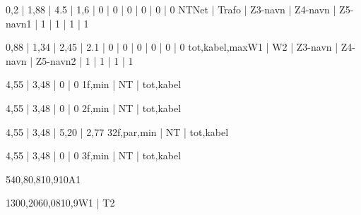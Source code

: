 \documentclass[a4paper,oneside,10pt,danish]{report}
\begin{document}
\begin{Ztotal}{ 0,2 | 1,88 | 4.5 | 1,6 | 0 | 0 | 0 | 0 | 0 | 0 }{NT}{Net | Trafo | Z3-navn | Z4-navn | Z5-navn}{1 | 1 | 1 | 1 | 1}
\end{Ztotal}

\begin{LV-Ztotal-max}{ 0,88 | 1,34 | 2,45 | 2.1 | 0 | 0 | 0 | 0 | 0 | 0 }{tot,kabel,max}{W1 | W2 | Z3-navn | Z4-navn | Z5-navn}{2 | 1 | 1 | 1 | 1}
\end{LV-Ztotal-max}

\begin{LV-Ik1f-kA}{ 4,55 | 3,48 | 0 | 0 }{1f,min | NT | tot,kabel}
\end{LV-Ik1f-kA}

\begin{LV-Ik2f-kA}{ 4,55 | 3,48 | 0 | 0 }{2f,min | NT | tot,kabel}
\end{LV-Ik2f-kA}

\begin{LV-Ik2f,parSikr-kA}{ 4,55 | 3,48 | 5,20 | 2,77 }{3}{2f,par,min | NT | tot,kabel}
\end{LV-Ik2f,parSikr-kA}

\begin{LV-Ik3f-kA}{ 4,55 | 3,48 | 0 | 0 }{3f,min | NT | tot,kabel}
\end{LV-Ik3f-kA}

\begin{faseKOMP-Iny}{540,8}{0,81}{0,9}{10}{A1}
\end{faseKOMP-Iny}

\begin{HV-deltaUnet}{130}{0,206}{0,081}{0,9}{W1 | T2}
\end{HV-deltaUnet}
\end{document}
